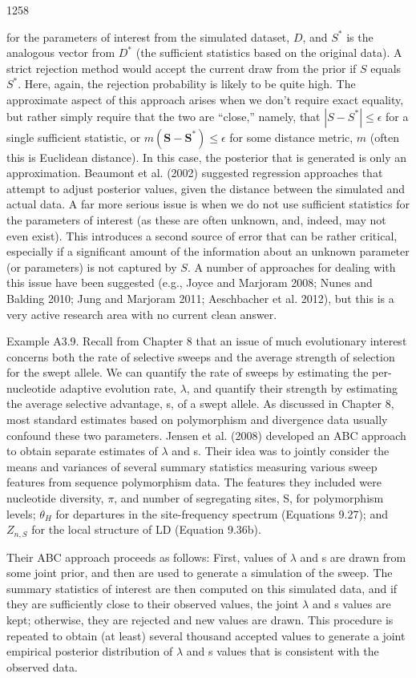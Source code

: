 \documentclass{article}
\begin{document}
1258

for the parameters of interest from the simulated dataset, $D$, and $S^{*}$ is the analogous vector from $D^{*}$ (the sufficient statistics based on the original data). A strict rejection method would accept the current draw from the prior if $S$ equals $S^{*}$. Here, again, the rejection probability is likely to be quite high. The approximate aspect of this approach arises when we don't require exact equality, but rather simply require that the two are “close,” namely, that $|S - S^*| \leq \epsilon$ for a single sufficient statistic, or $m(\mathbf{S} - \mathbf{S}^*) \leq \epsilon$ for some distance metric, $m$ (often this is Euclidean distance). In this case, the posterior that is generated is only an approximation. Beaumont et al. (2002) suggested regression approaches that attempt to adjust posterior values, given the distance between the simulated and actual data. A far more serious issue is when we do not use sufficient statistics for the parameters of interest (as these are often unknown, and, indeed, may not even exist). This introduces a second source of error that can be rather critical, especially if a significant amount of the information about an unknown parameter (or parameters) is not captured by $S$. A number of approaches for dealing with this issue have been suggested (e.g., Joyce and Marjoram 2008; Nunes and Balding 2010; Jung and Marjoram 2011; Aeschbacher et al. 2012), but this is a very active research area with no current clean answer.

Example A3.9. Recall from Chapter 8 that an issue of much evolutionary interest concerns both the rate of selective sweeps and the average strength of selection for the swept allele. We can quantify the rate of sweeps by estimating the per-nucleotide adaptive evolution rate,  $ \lambda $, and quantify their strength by estimating the average selective advantage, s, of a swept allele. As discussed in Chapter 8, most standard estimates based on polymorphism and divergence data usually confound these two parameters. Jensen et al. (2008) developed an ABC approach to obtain separate estimates of  $ \lambda $ and s. Their idea was to jointly consider the means and variances of several summary statistics measuring various sweep features from sequence polymorphism data. The features they included were nucleotide diversity,  $ \pi $, and number of segregating sites, S, for polymorphism levels;  $ \theta_H $ for departures in the site-frequency spectrum (Equations 9.27); and  $ Z_{n,S} $ for the local structure of LD (Equation 9.36b).

Their ABC approach proceeds as follows: First, values of  $ \lambda $ and s are drawn from some joint prior, and then are used to generate a simulation of the sweep. The summary statistics of interest are then computed on this simulated data, and if they are sufficiently close to their observed values, the joint  $ \lambda $ and s values are kept; otherwise, they are rejected and new values are drawn. This procedure is repeated to obtain (at least) several thousand accepted values to generate a joint empirical posterior distribution of  $ \lambda $ and s values that is consistent with the observed data.
\end{document}
